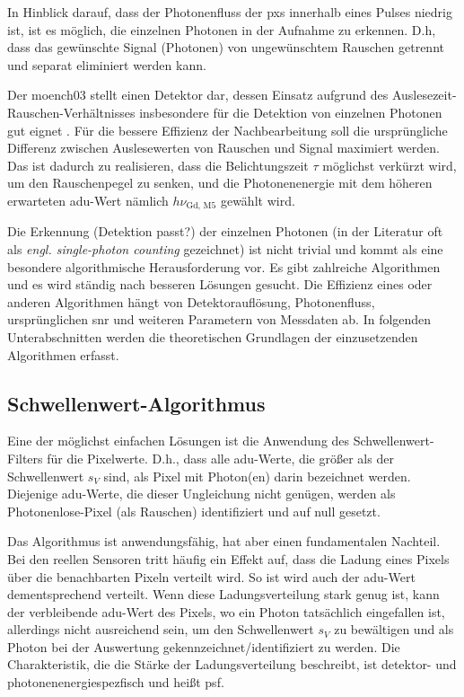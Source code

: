 \noindent
In Hinblick darauf, dass der Photonenfluss der \gls{pxs} innerhalb eines Pulses niedrig ist, ist es möglich, die einzelnen Photonen in der Aufnahme zu erkennen. D.h, dass das gewünschte Signal (Photonen) von ungewünschtem Rauschen getrennt und separat eliminiert werden kann.

\noindent
Der \gls{moench03} stellt einen Detektor dar, dessen Einsatz aufgrund des Auslesezeit-Rauschen-Ver\-hält\-nis\-ses insbesondere für die Detektion von einzelnen Photonen gut eignet \cite{bergamaschi_monch_2018}. Für die bessere Effizienz der Nachbearbeitung soll die ursprüngliche Differenz zwischen Auslesewerten von Rauschen und Signal maximiert werden. Das ist dadurch zu realisieren, dass die Belichtungszeit $\tau$ möglichst verkürzt wird, um den Rauschenpegel zu senken, und die Photonenenergie mit dem höheren erwarteten \gls{adu}-Wert nämlich $h\nu_{\text{Gd, M5}}$ gewählt wird.

\noindent
Die Erkennung (Detektion passt?) der einzelnen Photonen (in der Literatur oft als \emph{engl. single-photon counting} gezeichnet) ist nicht trivial und kommt als eine besondere algorithmische Herausforderung vor. Es gibt zahlreiche Algorithmen und es wird ständig nach besseren Lösungen gesucht. Die Effizienz eines oder anderen Algorithmen hängt von Detektorauflösung, Photonenfluss, ursprünglichen \gls{snr} und weiteren Parametern von Messdaten ab. In folgenden Unterabschnitten werden die theoretischen Grundlagen der einzusetzenden Algorithmen erfasst.

\subsection{Schwellenwert-Algorithmus}
\label{text:threshold_algorithm}
Eine der möglichst einfachen Lösungen ist die Anwendung des Schwellenwert-Filters für die Pixelwerte. D.h., dass alle \gls{adu}-Werte, die größer als der Schwellenwert $s_V$ sind, als Pixel mit Photon(en) darin bezeichnet werden. Diejenige \gls{adu}-Werte, die dieser Ungleichung nicht genügen, werden als Photonenlose-Pixel (als Rauschen) identifiziert und auf null gesetzt.

\noindent
Das Algorithmus ist anwendungsfähig, hat aber einen fundamentalen Nachteil. Bei den reellen Sensoren tritt häufig ein Effekt auf, dass die Ladung eines Pixels über die benachbarten Pixeln verteilt wird. So ist wird auch der \gls{adu}-Wert dementsprechend verteilt. Wenn diese Ladungsverteilung  stark genug ist, kann der verbleibende \gls{adu}-Wert des Pixels, wo ein Photon tatsächlich eingefallen ist, allerdings nicht ausreichend sein, um den Schwellenwert $s_V$ zu bewältigen und als Photon bei der Auswertung gekennzeichnet/identifiziert zu werden. Die Charakteristik, die die Stärke der Ladungsverteilung beschreibt, ist detektor- und photonenenergiespezfisch und heißt \gls{psf}.

